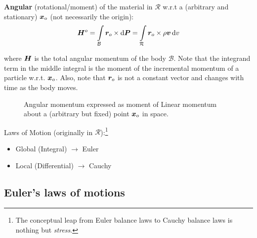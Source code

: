 \begin{definition}
  \textbf{Angular} (rotational/moment) of the material in \(\mathcal{R}\) w.r.t a (arbitrary and stationary) \(\bm{x}_o\) (not necessarily the origin):
\begin{equation}
  \bm{H}^o = \int\limits_\mathcal{B} \bm{r}_o \mathbin{\times} \mathop{}\!\mathrm{d} \bm{P} = \int\limits_\mathcal{R} \bm{r}_o \mathbin{\times} \rho \bm{v} \mathop{}\!\mathrm{d} v
\end{equation}
\end{definition}
where \(\bm{H}\) is the total angular momentum of the body \(\mathcal{B}\). Note that the integrand term in the middle integral is the moment of the incremental momentum of a particle w.r.t. \(\bm{x}_o\). Also, note that \(\bm{r}_o\) is not a constant vector and changes with time as the body moves.

\begin{figure}[H]
  \centering
  \caption{Angular momentum expressed as moment of Linear momentum about a (arbitrary but fixed) point \(\bm{x}_o\) in space.}
  \label{fig:}
\end{figure}

Laws of Motion (originally in \(\mathcal{R}\)):\footnote{
  The conceptual leap from Euler balance laws to Cauchy balance laws is nothing but \emph{stress}.
}
%
\begin{itemize}
  \item Global (Integral) $\rightarrow$ Euler
  \item Local (Differential) $\rightarrow$ Cauchy
\end{itemize}


\subsection{Euler's laws of motions}

